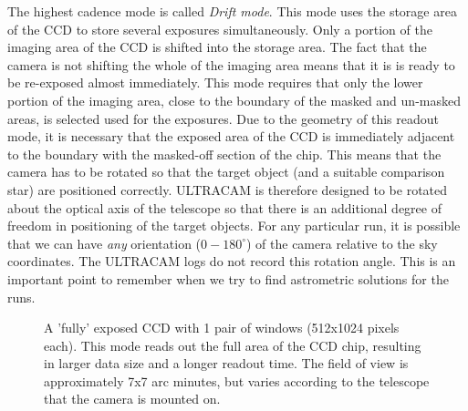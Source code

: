 The highest cadence mode is called \emph{Drift mode}. This mode uses the storage area of the CCD to store several exposures simultaneously. Only a portion of the imaging area of the CCD is shifted into the storage area. The fact that the camera is not shifting the whole of the imaging area means that it is is ready to be re-exposed almost immediately. This mode requires that only the lower portion of the imaging area, close to the boundary of the masked and un-masked areas, is selected used for the exposures. Due to the geometry of this readout mode, it is necessary that the exposed area of the CCD is immediately adjacent to the boundary with the masked-off section of the chip. This means that the camera has to be rotated so that the target object (and a suitable comparison star) are positioned correctly. ULTRACAM is therefore designed to be rotated about the optical axis of the telescope so that there is an additional degree of freedom in positioning of the target objects. For any particular run, it is possible that we can have \emph{any} orientation ($0-180^{\circ}$) of the camera relative to the sky coordinates. The ULTRACAM logs do not record this rotation angle. This is an important point to remember when we try to find astrometric solutions for the runs.    

\begin{figure}
  \centering
  \setlength{\fboxsep}{0pt}
  \setlength{\fboxrule}{1pt}
  \caption{A 'fully' exposed CCD with 1 pair of windows (512x1024 pixels each).  This mode reads out the full area of the CCD chip, resulting in larger data size and a longer readout time. The field of view is approximately 7x7 arc minutes, but varies according to the telescope that the camera is mounted on.}
  \label{fig:KOI-824}
\end{figure}

